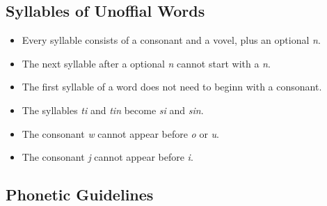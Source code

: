 \subsection*{Syllables of Unoffial Words}

\begin{itemize}
    \item
          Every syllable consists of a consonant and a vovel, plus an optional \textit{n}.
    \item
          The next syllable after a optional \textit{n} cannot start with a \textit{n}.
    \item
          The first syllable of a word does not need to beginn with a consonant.
    \item
          The syllables \textit{ti} and \textit{tin} become \textit{si} and \textit{sin}.
    \item
          The consonant \textit{w} cannot appear before \textit{o} or \textit{u}.
    \item
          The consonant \textit{j} cannot appear before \textit{i}.
\end{itemize}

\newpage
\subsection*{Phonetic Guidelines}

